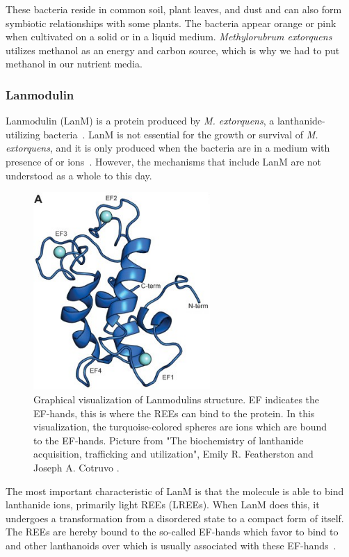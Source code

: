These bacteria reside in common soil, plant leaves, and dust and can also form symbiotic
relationships with some plants.
The bacteria appear orange or pink when cultivated on a solid or in a liquid medium.
\emph{Methylorubrum extorquens} utilizes methanol as an energy
and carbon source, which is why we had to put methanol in our nutrient media.

\subsubsection{Lanmodulin\authorA}

Lanmodulin (LanM) is a protein produced by \textit{M. extorquens}, a lanthanide-utilizing bacteria~\cite{lanmdiscovery}.
LanM is not essential for the growth or survival of \textit{M. extorquens}, and it is only produced when the bacteria are in a medium with presence of  or  ions~\cite{lanmroleinbiology}.
However, the mechanisms that include LanM are not understood as a whole to this day.

\begin{figure}[H]
    \centering
    \includegraphics[width=0.6\textwidth]{./media/images/lanm_structure}
    \caption{Graphical visualization of Lanmodulins structure. EF indicates the EF-hands, this is where the REEs can bind to the protein. In this visualization, the turquoise-colored spheres are  ions which are bound to the EF-hands. Picture from "The biochemistry of lanthanide acquisition, trafficking and utilization", Emily R. Featherston and Joseph A. Cotruvo \cite{lanmroleinbiology}.}
    \label{fig:lanm_structure}
\end{figure}

The most important characteristic of LanM is that the molecule is able to bind lanthanide ions, primarily light REEs (LREEs).
When LanM does this, it undergoes a transformation from a disordered state to a compact form of itself.
The REEs are hereby bound to the so-called EF-hands which favor to bind to  and other lanthanoids over  which is usually associated with these EF-hands~\cite{lanmstructure}.





